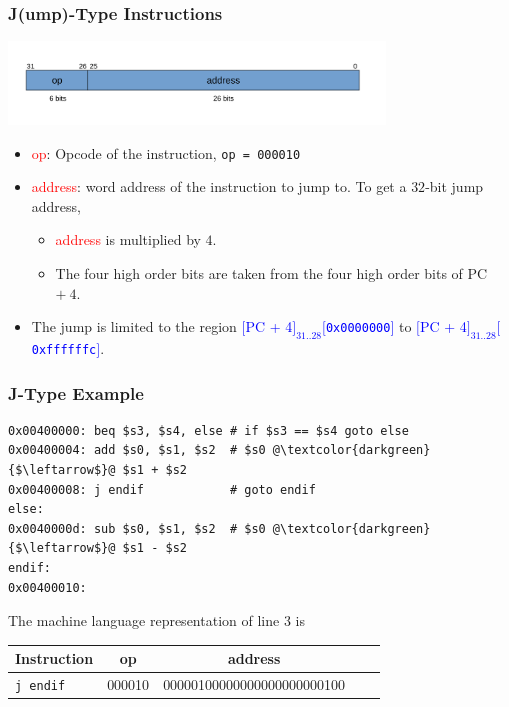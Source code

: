 \documentclass{beamer}
\begin{document}
\begin{frame}%
\frametitle{J(ump)-Type Instructions}

\begin{center}
  \includegraphics[width=10cm]{jtype.pdf}
\end{center}

\vspace{-0.3cm}

\begin{itemize}
\item \textcolor{red}{op}: Opcode of the instruction, \texttt{op = 000010}
\vspace{0.2cm}
\item \textcolor{red}{address}: word address of the instruction to jump to. To get a $32$-bit jump address,
  \begin{itemize}
  \item \textcolor{red}{address} is multiplied by $4$.
  \item The four high order bits are taken from the four high order bits of PC $+\ 4$.
  \end{itemize}
\item The jump is limited to the region \textcolor{blue}{$[$PC + 4$]_{31..28}[$\texttt{0x0000000}$]$} to \textcolor{blue}{$[$PC + 4$]_{31..28}[$\texttt{0xffffffc}$]$}.
\end{itemize}

\end{frame}

\begin{frame}[fragile]
\frametitle{J-Type Example}

\scriptsize

\begin{lstlisting}
0x00400000: beq $s3, $s4, else # if $s3 == $s4 goto else
0x00400004: add $s0, $s1, $s2  # $s0 @\textcolor{darkgreen}{$\leftarrow$}@ $s1 + $s2
0x00400008: j endif            # goto endif
else:
0x0040000d: sub $s0, $s1, $s2  # $s0 @\textcolor{darkgreen}{$\leftarrow$}@ $s1 - $s2
endif:
0x00400010:
\end{lstlisting}

\vspace{0.5cm}

The machine language representation of line $3$ is\\
\vspace{0.2cm}

\begin{center}
\begin{tabular}{|l|c|c|c|c|}
  \hline
  \multicolumn{1}{|c|}{Instruction} & op & address\\
  \hline
  \hline
  \lstinline!j endif! & 000010 & 00000100000000000000000100\\
  \hline
\end{tabular}
\end{center}

\end{frame}
\end{document}
